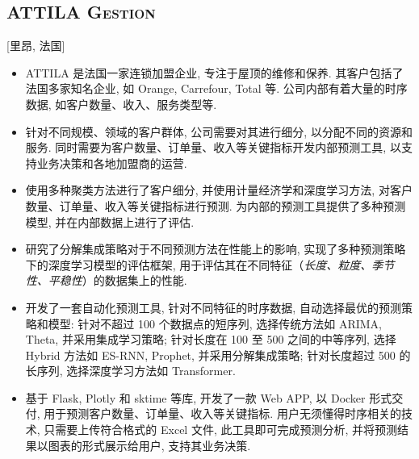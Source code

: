 \documentclass{mycv}
\begin{document}
\subsection{\large \scshape ATTILA Gestion}[里昂, 法国]

\begin{positions}
\end{positions}

\begin{itemize}
  \itemsep 0.4em
  \item ATTILA 是法国一家连锁加盟企业, 专注于屋顶的维修和保养. 其客户包括了法国多家知名企业, 如 Orange, Carrefour, Total 等. 公司内部有着大量的时序数据, 如客户数量、收入、服务类型等.
  \item 针对不同规模、领域的客户群体, 公司需要对其进行细分, 以分配不同的资源和服务. 同时需要为客户数量、订单量、收入等关键指标开发内部预测工具, 以支持业务决策和各地加盟商的运营.
  \item 使用多种聚类方法进行了客户细分, 并使用计量经济学和深度学习方法, 对客户数量、订单量、收入等关键指标进行预测. 为内部的预测工具提供了多种预测模型, 并在内部数据上进行了评估.
  \item 研究了分解集成策略对于不同预测方法在性能上的影响, 实现了多种预测策略下的深度学习模型的评估框架, 用于评估其在不同特征（\emph{长度、粒度、季节性、平稳性}）的数据集上的性能.
  \item 开发了一套自动化预测工具, 针对不同特征的时序数据, 自动选择最优的预测策略和模型: 针对不超过 100 个数据点的短序列, 选择传统方法如 ARIMA, Theta, 并采用集成学习策略; 针对长度在 100 至 500 之间的中等序列, 选择 Hybrid 方法如 ES-RNN, Prophet, 并采用分解集成策略; 针对长度超过 500 的长序列, 选择深度学习方法如 Transformer.
  \item 基于 Flask, Plotly 和 sktime 等库, 开发了一款 Web APP, 以 Docker 形式交付, 用于预测客户数量、订单量、收入等关键指标. 用户无须懂得时序相关的技术, 只需要上传符合格式的 Excel 文件, 此工具即可完成预测分析, 并将预测结果以图表的形式展示给用户, 支持其业务决策.
\end{itemize}



\end{document}
